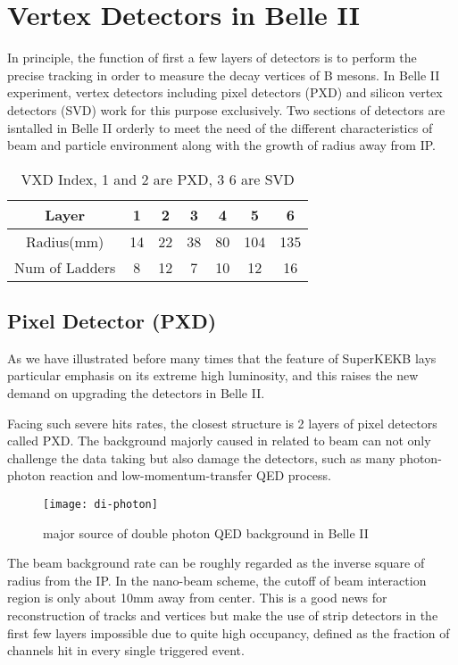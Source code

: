\chapter{Vertex Detectors in Belle II }

In principle, the function of first a few layers of detectors is to perform the precise tracking in order to measure the decay vertices of B mesons. In Belle II experiment, vertex detectors including pixel detectors (PXD) and silicon vertex detectors (SVD) work for this purpose exclusively. Two sections of detectors are isntalled in Belle II orderly to meet the need of the different characteristics of beam and particle environment along with the growth of radius away from IP. 

\begin{table}[hbp]
	\centering
	\caption{VXD Index, 1 and 2 are PXD, 3 \text{-} 6 are SVD}
	\begin{tabular}{c|c|c|c|c|c|c}
		\hline
		Layer & 1 & 2 & 3 & 4 & 5 &6 \\
		\hline
		Radius(mm) & 14 & 22 & 38 & 80 & 104 & 135 \\
		\hline
		Num of Ladders & 8 & 12 & 7 & 10 & 12 & 16 \\
		\hline
	\end{tabular}
\end{table}

\section{Pixel Detector (PXD)}
	As we have illustrated before many times that the feature of SuperKEKB lays particular emphasis on its extreme high luminosity, and this raises the new demand on upgrading the detectors in Belle II. 
	
	Facing such severe hits rates, the closest structure is 2 layers of pixel detectors called PXD. The background majorly caused in related to beam can not only challenge the data taking but also damage the detectors, such as many photon-photon reaction and low-momentum-transfer QED process. 
	
	\begin{figure}[htbp]
		\centering
		\texttt{[image: di-photon]}
		\caption{major source of double photon QED background in Belle II }
	\end{figure}
	The beam background rate can be roughly regarded as the inverse square of radius from the IP. In the nano-beam scheme, the cutoff of beam interaction region is only about 10mm away from center. This is a good news for reconstruction of tracks and vertices but make the use of strip detectors in the first few layers impossible due to quite high occupancy, defined as the fraction of channels hit in every single triggered event.
	
